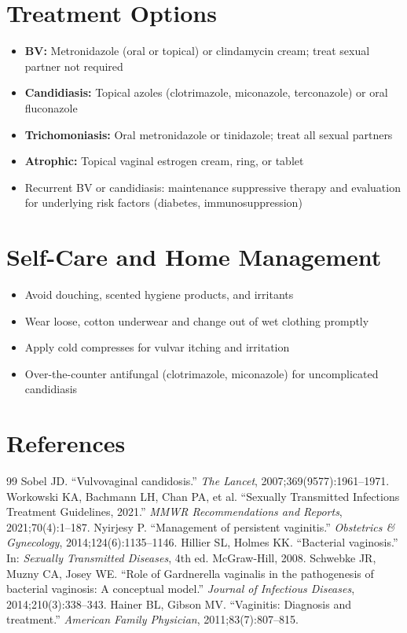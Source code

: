 \section*{Treatment Options}
\begin{itemize}
  \item \textbf{BV:} Metronidazole (oral or topical) or clindamycin cream; treat sexual partner not required
  \item \textbf{Candidiasis:} Topical azoles (clotrimazole, miconazole, terconazole) or oral fluconazole
  \item \textbf{Trichomoniasis:} Oral metronidazole or tinidazole; treat all sexual partners
  \item \textbf{Atrophic:} Topical vaginal estrogen cream, ring, or tablet
  \item Recurrent BV or candidiasis: maintenance suppressive therapy and evaluation for underlying risk factors (diabetes, immunosuppression)
\end{itemize}

\section*{Self-Care and Home Management}
\begin{itemize}
  \item Avoid douching, scented hygiene products, and irritants
  \item Wear loose, cotton underwear and change out of wet clothing promptly
  \item Apply cold compresses for vulvar itching and irritation
  \item Over-the-counter antifungal (clotrimazole, miconazole) for uncomplicated candidiasis
\end{itemize}

\section*{References}
\begin{thebibliography}{99}
 Sobel JD. ``Vulvovaginal candidosis.'' \textit{The Lancet}, 2007;369(9577):1961--1971.
 Workowski KA, Bachmann LH, Chan PA, et al. ``Sexually Transmitted Infections Treatment Guidelines, 2021.'' \textit{MMWR Recommendations and Reports}, 2021;70(4):1--187.
 Nyirjesy P. ``Management of persistent vaginitis.'' \textit{Obstetrics \& Gynecology}, 2014;124(6):1135--1146.
 Hillier SL, Holmes KK. ``Bacterial vaginosis.'' In: \textit{Sexually Transmitted Diseases}, 4th ed. McGraw-Hill, 2008.
 Schwebke JR, Muzny CA, Josey WE. ``Role of Gardnerella vaginalis in the pathogenesis of bacterial vaginosis: A conceptual model.'' \textit{Journal of Infectious Diseases}, 2014;210(3):338--343.
 Hainer BL, Gibson MV. ``Vaginitis: Diagnosis and treatment.'' \textit{American Family Physician}, 2011;83(7):807--815.
\end{thebibliography}
